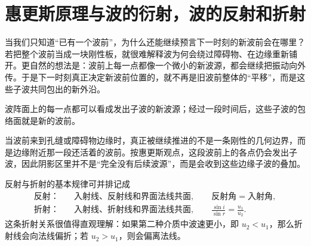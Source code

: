 
\section{惠更斯原理与波的衍射，波的反射和折射}

 当我们只知道“已有一个波前”，为什么还能继续预言下一时刻的新波前会在哪里？若把整个波前当成一块刚性板，就很难解释波为何会绕过障碍物、在边缘重新铺开。更自然的想法是：波前上每一点都像一个微小的新波源，都会继续把振动向外传。于是下一时刻真正决定新波前位置的，就不再是旧波前整体的“平移”，而是这些子波共同包出的新外沿。

\begin{theorem}[惠更斯原理]
波阵面上的每一点都可以看成发出子波的新波源；经过一段时间后，这些子波的包络面就是新的波前。
\end{theorem}

 当波前来到孔缝或障碍物边缘时，真正被继续推进的不是一条刚性的几何边界，而是边缘附近那一段还活着的波前。按惠更斯观点，这段波前上的各点仍会发出子波，因此阴影区里并不是“完全没有后续波源”，而是会收到这些边缘子波的叠加。

\begin{theorem}[波的反射和折射]
反射与折射的基本规律可并排记成
\[
\begin{aligned}
\text{反射：}\quad &\text{入射线、反射线和界面法线共面},\qquad \text{反射角}=\text{入射角},\\
\text{折射：}\quad &\text{入射线、折射线和界面法线共面},\qquad \frac{\sin i}{\sin r}=\frac{u_1}{u_2}.
\end{aligned}
\]这条折射关系很值得直观理解：如果第二种介质中波速更小，即 \(u_2<u_1\)，那么折射线会向法线偏折；若 \(u_2>u_1\)，则会偏离法线。
\end{theorem}

